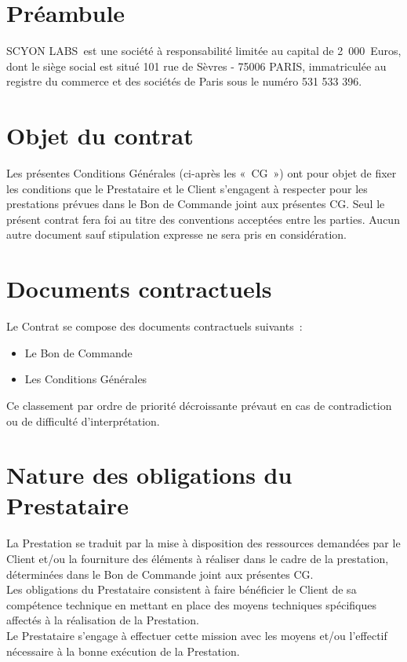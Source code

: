 \documentclass[9pt,french]{base}
\def \companyname {SCYON LABS}
\begin{document}

\begin{multicols*}{3}

\section*{Préambule}

\companyname\ est une société à responsabilité limitée au capital de 2~000~Euros, dont le siège social est situé 101 rue de Sèvres - 75006 PARIS, immatriculée au registre du commerce et des sociétés de Paris sous le numéro  531 533 396.

\section{Objet du contrat}

Les présentes Conditions Générales (ci-après les «~CG~») ont pour objet de fixer les conditions que le Prestataire et le Client s’engagent à respecter pour les prestations prévues dans le Bon de Commande joint aux présentes CG. Seul le présent contrat fera foi au titre des conventions acceptées entre les parties. Aucun autre document sauf stipulation expresse ne sera pris en considération.

\section{Documents contractuels}

Le Contrat se compose des documents contractuels suivants~:
\begin{itemize}
  \item Le Bon de Commande
  \item Les Conditions Générales
\end{itemize}
Ce classement par ordre de priorité décroissante prévaut en cas de contradiction ou de difficulté d’interprétation.

\section{Nature des obligations du Prestataire}

La Prestation se traduit par la mise à disposition des ressources demandées par le Client et/ou la fourniture des éléments à réaliser dans le cadre de la prestation, déterminées dans le Bon de Commande joint aux présentes CG. \\
Les obligations du Prestataire consistent à faire bénéficier le Client de sa compétence technique en mettant en place des moyens techniques spécifiques affectés à la réalisation de la Prestation. \\
Le Prestataire s’engage à effectuer cette mission avec les moyens et/ou l’effectif nécessaire à la bonne exécution de la Prestation.


\end{multicols*}
\end{document}

